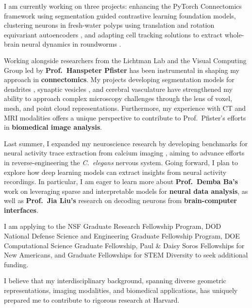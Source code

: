 \documentclass[letterpaper,11pt]{article}
\begin{document}
I am currently working on three projects: enhancing the PyTorch Connectomics framework using segmentation guided contrastive learning foundation models, clustering neurons in fresh-water polyps  using translation and rotation equivariant autoencoders , and adapting cell tracking solutions to extract whole-brain neural dynamics in roundworms .

Working alongside researchers from the Lichtman Lab and the Visual Computing Group led by \textbf{Prof.\ Hanspeter Pfister} has been instrumental in shaping my approach in \textbf{connectomics}. My projects developing segmentation models for dendrites , synaptic vesicles , and cerebral vasculature  have strengthened my ability to approach complex microscopy challenges through the lens of voxel, mesh, and point cloud representations. Furthermore, my experience with CT and MRI modalities  offers a unique perspective to contribute to Prof.\ Pfister’s efforts in \textbf{biomedical image analysis}.

Last summer, I expanded my neuroscience research by developing benchmarks for neural activity trace extraction from calcium imaging , aiming to advance efforts in reverse-engineering the \textit{C.\ elegans} nervous system. Going forward, I plan to explore how deep learning models can extract insights from neural activity recordings. In particular, I am eager to learn more about \textbf{Prof.\ Demba Ba’s} work on leveraging sparse and interpretable models for \textbf{neural data analysis}, as well as \textbf{Prof.\ Jia Liu’s} research on decoding neurons from \textbf{brain-computer interfaces}.

I am applying to the NSF Graduate Research Fellowship Program, DOD National Defense Science and Engineering Graduate Fellowship Program, DOE Computational Science Graduate Fellowship, Paul \& Daisy Soros Fellowships for New Americans, and Graduate Fellowships for STEM Diversity to seek additional funding.

I believe that my interdisciplinary background, spanning diverse geometric representations, imaging modalities, and biomedical applications, has uniquely prepared me to contribute to rigorous research at Harvard.
\end{document}

